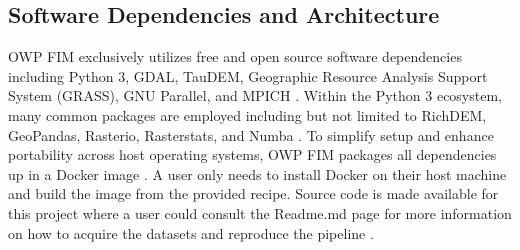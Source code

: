 \subsection{Software Dependencies and Architecture}
\label{ssec:software}
%
OWP FIM exclusively utilizes free and open source software dependencies including Python 3, GDAL, TauDEM, Geographic Resource Analysis Support System (GRASS), GNU Parallel, and MPICH \cite{python382,gdal2020,tarboton2005terrain,grass2020,tange2015gnu,amer2021mpich}.
Within the Python 3 ecosystem, many common packages are employed including but not limited to RichDEM, GeoPandas, Rasterio, Rasterstats, and Numba \cite{barnes2018richdem,jordahl2014geopandas,lam2015numba}. 
To simplify setup and enhance portability across host operating systems, OWP FIM packages all dependencies up in a Docker image \cite{merkel2014docker}. 
A user only needs to install Docker on their host machine and build the image from the provided recipe. 
Source code is made available for this project where a user could consult the Readme.md page for more information on how to acquire the datasets and reproduce the pipeline \cite{inundationMapping2022,imHS2023}.
%
